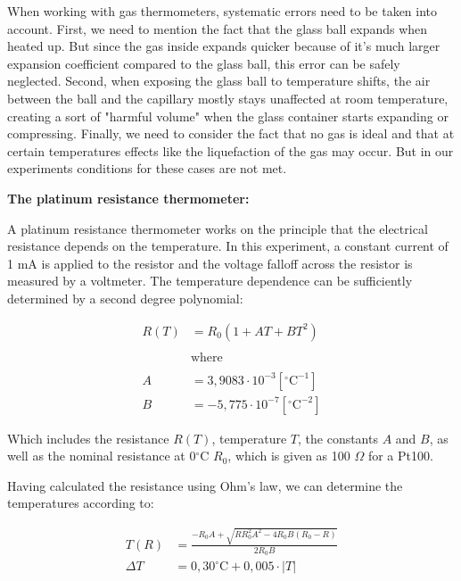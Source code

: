 \documentclass{article}
\begin{document}
When working with gas thermometers, systematic errors need to be taken into account. First, we need to mention the fact that the glass ball expands when heated up. But since the gas inside expands quicker because of it's much larger expansion coefficient compared to the glass ball, this error can be safely neglected. Second, when exposing the glass ball to temperature shifts, the air between the ball and the capillary mostly stays unaffected at room temperature, creating a sort of "harmful volume" when the glass container starts expanding or compressing. Finally, we need to consider the fact that no gas is ideal and that at certain temperatures effects like the liquefaction of the gas may occur. But in our experiments conditions for these cases are not met.

\textbf{The platinum resistance thermometer:}

A platinum resistance thermometer works on the principle that the electrical resistance depends on the temperature. In this experiment, a constant current of 1 mA is applied to the resistor and the voltage falloff across the resistor is measured by a voltmeter. The temperature dependence can be sufficiently determined by a second degree polynomial:

\begin{equation}
    \begin{split}
        R(T) &= R_0 (1+AT+BT^2) \\ \\
        & \text{where} \\ \\
        A &= 3,9083 \cdot 10^{-3} [^{\circ}\text{C}^{-1}] \\
        B&= -5,775 \cdot 10^{-7} [^{\circ}\text{C}^{-2}]
    \end{split}
\end{equation}

Which includes the resistance $R(T)$, temperature $T$, the constants $A$ and $B$, as well as the nominal resistance at 0$^{\circ}$C $R_0$, which is given as 100 $\Omega$ for a Pt100. 

Having calculated the resistance using Ohm's law, we can determine the temperatures according to:

\begin{equation}
    \begin{split}
        T(R) &= \frac{-R_0A + \sqrt{RR_0^2A^2 - 4R_0B(R_0-R)}}{2R_0B} \\
        \Delta T &= 0,30 ^{\circ}\text{C} + 0,005 \cdot |T|
    \end{split}
\end{equation}
\end{document}
